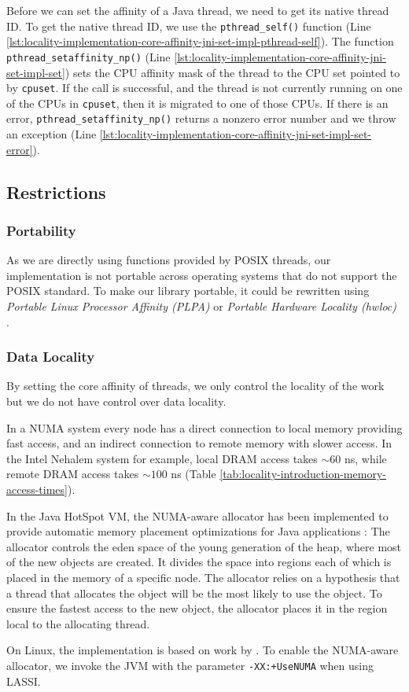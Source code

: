 Before we can set the affinity of a Java thread, we need to get its
native thread ID. To get the native thread ID, we use the
\lstinline!pthread_self()! function (Line
\ref{lst:locality-implementation-core-affinity-jni-set-impl-pthread-self}). The
function \lstinline!pthread_setaffinity_np()! (Line
\ref{lst:locality-implementation-core-affinity-jni-set-impl-set}) sets
the CPU affinity mask of the thread to the CPU set pointed to by
\lstinline!cpuset!.  If the call is successful, and the thread is not
currently running on one of the CPUs in \lstinline!cpuset!, then it is
migrated to one of those CPUs. If there is an error,
\lstinline!pthread_setaffinity_np()!  returns a nonzero error number
and we throw an exception (Line
\ref{lst:locality-implementation-core-affinity-jni-set-impl-set-error}).

\subsection{Restrictions}
\label{sec:locality-implementation-core-affinity-restrictions}

\subsubsection{Portability}

As we are directly using functions provided by POSIX threads, our
implementation is not portable across operating systems that do not
support the POSIX standard. To make our library portable, it could be
rewritten using \emph{Portable Linux Processor Affinity (PLPA)}
\cite{OpenMPI2010a} or \emph{Portable Hardware Locality (hwloc)}
\cite{OpenMPI2010}.

\subsubsection{Data Locality}

By setting the core affinity of threads, we only control the locality
of the work but we do not have control over data locality.

In a NUMA system every node has a direct connection to local memory
providing fast access, and an indirect connection to remote memory
with slower access. In the Intel Nehalem system for example, local
DRAM access takes $\sim 60$ ns, while remote DRAM access takes $\sim
100$ ns (Table \ref{tab:locality-introduction-memory-access-times}).

In the Java HotSpot VM, the NUMA-aware allocator has been implemented
to provide automatic memory placement optimizations for Java
applications \cite{Masamitsu2008, Oracle2010, Humble2010}: The
allocator controls the eden space of the young generation of the heap,
where most of the new objects are created. It divides the space into
regions each of which is placed in the memory of a specific node. The
allocator relies on a hypothesis that a thread that allocates the
object will be the most likely to use the object. To ensure the
fastest access to the new object, the allocator places it in the
region local to the allocating thread.

On Linux, the implementation is based on work by
\textcite{Kleen2004}. To enable the NUMA-aware allocator, we invoke
the JVM with the parameter \verb!-XX:+UseNUMA! when using LASSI.


